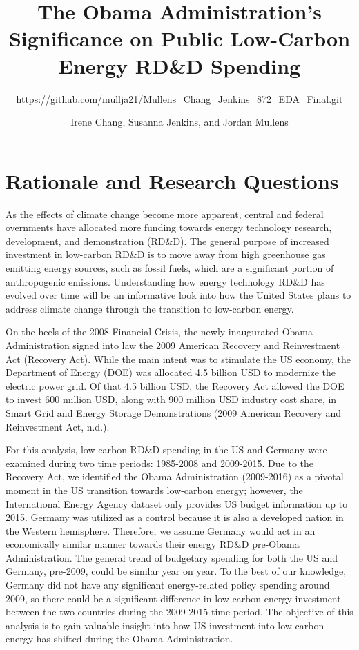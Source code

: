 \documentclass[
  12pt,
]{article}
\title{The Obama Administration's Significance on Public Low-Carbon
Energy RD\&D Spending}
\subtitle{\url{https://github.com/mullja21/Mullens_Chang_Jenkins_872_EDA_Final.git}}
\author{Irene Chang, Susanna Jenkins, and Jordan Mullens}
\date{}
\begin{document}
\maketitle

\newpage
\tableofcontents 
\newpage
\listoftables 
\newpage
\listoffigures 
\newpage

\hypertarget{rationale-and-research-questions}{%
\section{Rationale and Research
Questions}\label{rationale-and-research-questions}}

As the effects of climate change become more apparent, central and
federal overnments have allocated more funding towards energy technology
research, development, and demonstration (RD\&D). The general purpose of
increased investment in low-carbon RD\&D is to move away from high
greenhouse gas emitting energy sources, such as fossil fuels, which are
a significant portion of anthropogenic emissions. Understanding how
energy technology RD\&D has evolved over time will be an informative
look into how the United States plans to address climate change through
the transition to low-carbon energy.

On the heels of the 2008 Financial Crisis, the newly inaugurated Obama
Administration signed into law the 2009 American Recovery and
Reinvestment Act (Recovery Act). While the main intent was to stimulate
the US economy, the Department of Energy (DOE) was allocated 4.5 billion
USD to modernize the electric power grid. Of that 4.5 billion USD, the
Recovery Act allowed the DOE to invest 600 million USD, along with 900
million USD industry cost share, in Smart Grid and Energy Storage
Demonstrations (2009 American Recovery and Reinvestment Act, n.d.).

For this analysis, low-carbon RD\&D spending in the US and Germany were
examined during two time periods: 1985-2008 and 2009-2015. Due to the
Recovery Act, we identified the Obama Administration (2009-2016) as a
pivotal moment in the US transition towards low-carbon energy; however,
the International Energy Agency dataset only provides US budget
information up to 2015. Germany was utilized as a control because it is
also a developed nation in the Western hemisphere. Therefore, we assume
Germany would act in an economically similar manner towards their energy
RD\&D pre-Obama Administration. The general trend of budgetary spending
for both the US and Germany, pre-2009, could be similar year on year. To
the best of our knowledge, Germany did not have any significant
energy-related policy spending around 2009, so there could be a
significant difference in low-carbon energy investment between the two
countries during the 2009-2015 time period. The objective of this
analysis is to gain valuable insight into how US investment into
low-carbon energy has shifted during the Obama Administration.
\end{document}
